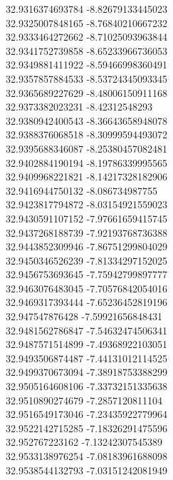 {32.9316374693784	-8.82679133445023\\
32.9325007848165	-8.76840210667232\\
32.9333464272662	-8.71025093963844\\
32.9341752739858	-8.65233966736053\\
32.9349881411922	-8.59466998360491\\
32.9357857884533	-8.53724345093345\\
32.9365689227629	-8.48006150911168\\
32.9373382023231	-8.42312548293\\
32.9380942400543	-8.36643658948078\\
32.9388376068518	-8.30999594493072\\
32.9395688346087	-8.25380457082481\\
32.9402884190194	-8.19786339995565\\
32.9409968221821	-8.14217328182906\\
32.9416944750132	-8.086734987755\\
32.9423817794872	-8.03154921559023\\
32.9430591107152	-7.97661659415745\\
32.9437268188739	-7.92193768736388\\
32.9443852309946	-7.86751299804029\\
32.9450346526239	-7.81334297152025\\
32.9456753693645	-7.75942799897777\\
32.9463076483045	-7.70576842054016\\
32.9469317393444	-7.65236452819196\\
32.947547876428	-7.59921656848431\\
32.9481562786847	-7.54632474506341\\
32.9487571514899	-7.49368922103051\\
32.9493506874487	-7.44131012114525\\
32.9499370673094	-7.38918753388299\\
32.9505164608106	-7.33732151335638\\
32.9510890274679	-7.2857120811104\\
32.9516549173046	-7.23435922779964\\
32.9522142715285	-7.18326291475596\\
32.952767223162	-7.13242307545389\\
32.9533138976254	-7.08183961688098\\
32.9538544132793	-7.03151242081949\\
}
